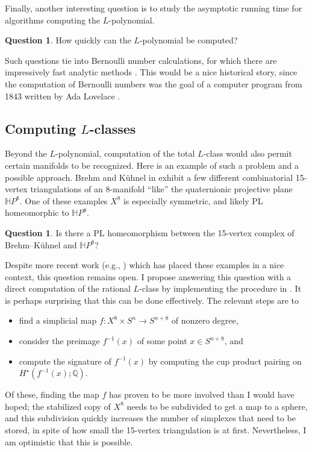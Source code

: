 \documentclass[12pt]{amsart}
\theoremstyle{definition}
\newtheorem{question}[theorem]{Question}
\newcommand{\Q}{\mathbb{Q}}
\begin{document}
Finally, another interesting question is to study the asymptotic
running time for algorithms computing the $L$-polynomial.
\begin{question}
How quickly can the $L$-polynomial be computed?
\end{question}
Such questions tie into Bernoulli number calculations, for which there
are impressively fast analytic methods \cite{MR2684369}.  This would
be a nice historical story, since the computation of Bernoulli numbers
was the goal of a computer program from 1843 written by Ada Lovelace
\cite{MR550674}.

\subsection{Computing $L$-classes}

Beyond the $L$-polynomial, computation of the total $L$-class would
also permit certain manifolds to be recognized.  Here is an example of
such a problem and a possible approach.  Brehm and K\"uhnel in
\cite{MR1180457} exhibit a few different combinatorial 15-vertex
triangulations of an 8-manifold ``like'' the quaternionic projective
plane $\mathbb{H}P^8$.  One of these examples $X^8$ is especially
symmetric, and likely PL homeomorphic to $\mathbb{H}P^8$.
\begin{question}
Is there a PL homeomorphism between the 15-vertex complex of Brehm--K\"uhnel and $\mathbb{H}P^8$?
\end{question}
Despite more recent work (e.g., \cite{MR3038783}) which has placed
these examples in a nice context, this question remains open.  I
propose answering this question with a direct computation of the
rational $L$-class by implementing the procedure in \cite{MR440554}.
It is perhaps surprising that this can be done effectively.  The
relevant steps are to
\begin{itemize}
\item find a simplicial map $f : X^8 \times S^n \to S^{n+8}$ of nonzero degree,
\item consider the preimage $f^{-1}(x)$ of some point $x \in S^{n+8}$, and
\item compute the signature of $f^{-1}(x)$ by computing the cup product pairing on $H^\star(f^{-1}(x);\Q)$.
\end{itemize}
Of these, finding the map $f$ has proven to be more involved than I
would have hoped; the stabilized copy of $X^8$ needs to be subdivided
to get a map to a sphere, and this subdivision quickly increases the
number of simplexes that need to be stored, in spite of how small the
15-vertex triangulation is at first.  Nevertheless, I am optimistic
that this is possible.
\end{document}
